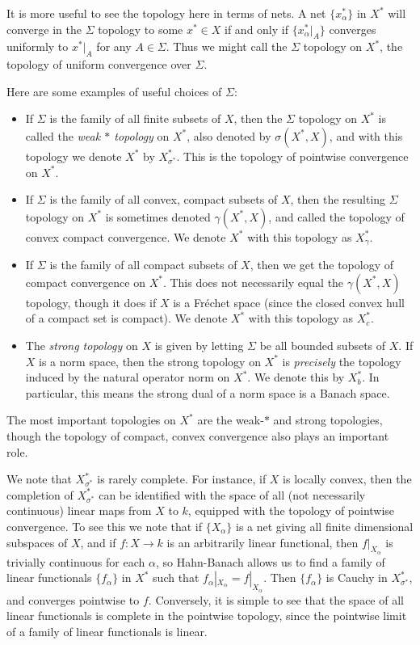 It is more useful to see the topology here in terms of nets. A net $\{ x_\alpha^* \}$ in $X^*$ will converge in the $\Sigma$ topology to some $x^* \in X$ if and only if $\{ x_\alpha^*|_A \}$ converges uniformly to $x^*|_A$ for any $A \in \Sigma$. Thus we might call the $\Sigma$ topology on $X^*$, the topology of uniform convergence over $\Sigma$.

Here are some examples of useful choices of $\Sigma$:
%
\begin{itemize}
    \item If $\Sigma$ is the family of all finite subsets of $X$, then the $\Sigma$ topology on $X^*$ is called the \emph{weak $*$ topology} on $X^*$, also denoted by $\sigma(X^*,X)$, and with this topology we denote $X^*$ by $X^*_{\sigma^*}$. This is the topology of pointwise convergence on $X^*$.

    \item If $\Sigma$ is the family of all convex, compact subsets of $X$, then the resulting $\Sigma$ topology on $X^*$ is sometimes denoted $\gamma(X^*,X)$, and called the topology of convex compact convergence. We denote $X^*$ with this topology as $X^*_\gamma$.

    \item If $\Sigma$ is the family of all compact subsets of $X$, then we get the topology of compact convergence on $X^*$. This does not necessarily equal the $\gamma(X^*,X)$ topology, though it does if $X$ is a Fr\'{e}chet space (since the closed convex hull of a compact set is compact). We denote $X^*$ with this topology as $X^*_c$.

    \item The \emph{strong topology} on $X$ is given by letting $\Sigma$ be all bounded subsets of $X$. If $X$ is a norm space, then the strong topology on $X^*$ is \emph{precisely} the topology induced by the natural operator norm on $X^*$. We denote this by $X^*_b$. In particular, this means the strong dual of a norm space is a Banach space.
\end{itemize}
%
The most important topologies on $X^*$ are the weak-$*$ and strong topologies, though the topology of compact, convex convergence also plays an important role.

We note that $X^*_{\sigma^*}$ is rarely complete. For instance, if $X$ is locally convex, then the completion of $X^*_{\sigma^*}$ can be identified with the space of all (not necessarily continuous) linear maps from $X$ to $k$, equipped with the topology of pointwise convergence. To see this we note that if $\{ X_\alpha \}$ is a net giving all finite dimensional subspaces of $X$, and if $f: X \to k$ is an arbitrarily linear functional, then $f|_{X_\alpha}$ is trivially continuous for each $\alpha$, so Hahn-Banach allows us to find a family of linear functionals $\{ f_\alpha \}$ in $X^*$ such that $f_\alpha|_{X_\alpha} = f|_{X_\alpha}$. Then $\{ f_\alpha \}$ is Cauchy in $X^*_{\sigma^*}$, and converges pointwise to $f$. Conversely, it is simple to see that the space of all linear functionals is complete in the pointwise topology, since the pointwise limit of a family of linear functionals is linear.

